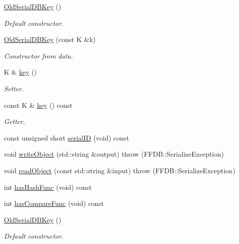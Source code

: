 \begin{DoxyCompactItemize}
\item 
\mbox{\hyperlink{classADATIO_1_1OldSerialDBKey_a4ebea5cb376cbc7ce81524c8b9723923}{Old\+Serial\+D\+B\+Key}} ()
\begin{DoxyCompactList}\small\item\em Default constructor. \end{DoxyCompactList}\item 
\mbox{\hyperlink{classADATIO_1_1OldSerialDBKey_a3b075f5aaa5e0d5e29f5a5dcfe51d575}{Old\+Serial\+D\+B\+Key}} (const K \&k)
\begin{DoxyCompactList}\small\item\em Constructor from data. \end{DoxyCompactList}\item 
K \& \mbox{\hyperlink{classADATIO_1_1OldSerialDBKey_ab191c26e658125d7ac4378c8b74d6f1b}{key}} ()
\begin{DoxyCompactList}\small\item\em Setter. \end{DoxyCompactList}\item 
const K \& \mbox{\hyperlink{classADATIO_1_1OldSerialDBKey_a10d8c5351439c43bacb5e365750e7b1d}{key}} () const
\begin{DoxyCompactList}\small\item\em Getter. \end{DoxyCompactList}\item 
const unsigned short \mbox{\hyperlink{classADATIO_1_1OldSerialDBKey_af45528e61ba59f1978d3492534dffd46}{serial\+ID}} (void) const
\item 
void \mbox{\hyperlink{classADATIO_1_1OldSerialDBKey_a4cc6346697a7bda74b9e14672cf21912}{write\+Object}} (std\+::string \&output)  throw (\+F\+F\+D\+B\+::\+Serialize\+Exception)
\item 
void \mbox{\hyperlink{classADATIO_1_1OldSerialDBKey_a4d79b5e8834dc154ddc981e153924ccd}{read\+Object}} (const std\+::string \&input)  throw (\+F\+F\+D\+B\+::\+Serialize\+Exception)
\item 
int \mbox{\hyperlink{classADATIO_1_1OldSerialDBKey_a5cf79bb34ed0e1a471eba03efe9988ad}{has\+Hash\+Func}} (void) const
\item 
int \mbox{\hyperlink{classADATIO_1_1OldSerialDBKey_a121b9e6811e4c16c9b05521b923b8dc7}{has\+Compare\+Func}} (void) const
\item 
\mbox{\hyperlink{classADATIO_1_1OldSerialDBKey_a4ebea5cb376cbc7ce81524c8b9723923}{Old\+Serial\+D\+B\+Key}} ()
\begin{DoxyCompactList}\small\item\em Default constructor. \end{DoxyCompactList}\item 

\end{DoxyCompactItemize}

